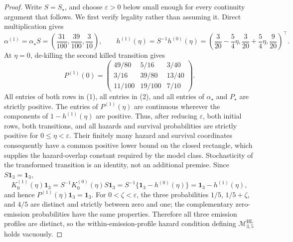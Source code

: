 \documentclass{article}
\begin{document}
\begin{proof}
Write \(S=S_{\star}\), and choose \(\varepsilon>0\) below small enough for every continuity argument that follows. We first verify legality rather than assuming it. Direct multiplication gives
\[
 \alpha^{(1)}=\alpha_{\star}S
 =\left(\frac{31}{100},\frac{39}{100},\frac3{10}\right),
 \qquad
 h^{(1)}(\eta)=S^{-1}h^{(0)}(\eta)
 =\left(\frac3{20}-\frac54\eta,\frac3{20}+\frac54\eta,\frac9{20}\right)^{\!\top}. \tag{1}
\]
At \(\eta=0\), de-killing the second killed transition gives
\[
 P^{(1)}(0)=
 \begin{pmatrix}
 49/80&5/16&3/40\\
 3/16&39/80&13/40\\
 11/100&19/100&7/10
 \end{pmatrix}.                                                \tag{2}
\]
All entries of both rows in (1), all entries in (2), and all entries of \(\alpha_{\star}\) and \(P_{\star}\) are strictly positive. The entries of \(P^{(1)}(\eta)\) are continuous wherever the components of \(1-h^{(1)}(\eta)\) are positive. Thus, after reducing \(\varepsilon\), both initial rows, both transitions, and all hazards and survival probabilities are strictly positive for \(0\le\eta<\varepsilon\). Their finitely many hazard and survival coordinates consequently have a common positive lower bound on the closed rectangle, which supplies the hazard-overlap constant required by the model class. Stochasticity of the transformed transition is an identity, not an additional premise. Since \(S\mathbf 1_3=\mathbf 1_3\),
\[
 K_0^{(1)}(\eta)\mathbf 1_3
 =S^{-1}K_0^{(0)}(\eta)S\mathbf 1_3
 =S^{-1}\{\mathbf 1_3-h^{(0)}(\eta)\}
 =\mathbf 1_3-h^{(1)}(\eta),                                  \tag{3}
\]
and hence \(P^{(1)}(\eta)\mathbf 1_3=\mathbf 1_3\). For \(0<\zeta<\varepsilon\), the three probabilities \(1/5\), \(1/5+\zeta\), and \(4/5\) are distinct and strictly between zero and one; the complementary zero-emission probabilities have the same properties. Therefore all three emission profiles are distinct, so the within-emission-profile hazard condition defining \(\mathcal M^{\mathrm{HL}}_{3,5}\) holds vacuously.


\end{proof}
\end{document}
